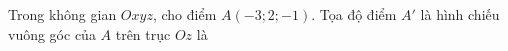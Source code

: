 \begin{ex}
Trong không gian $Oxyz$, cho điểm $A(-3;2;-1)$. Tọa độ điểm $A'$ là hình chiếu vuông góc của $A$ trên trục $Oz$ là
\end{ex}

